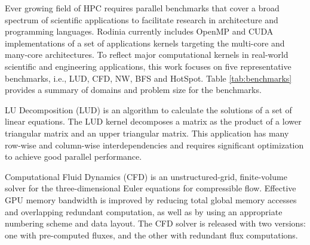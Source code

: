 
Ever growing field of HPC requires parallel benchmarks that cover a broad spectrum of scientific applications to 
facilitate research in architecture and programming languages. 
Rodinia currently includes OpenMP and CUDA implementations of a set of applications kernels targeting the multi-core and many-core 
architectures. To reflect major computational kernels in real-world scientific and engineering applications, this work focuses on five representative benchmarks, i.e., LUD, CFD, NW, BFS and HotSpot. Table \ref{tab:benchmarks} provides a summary of domains and problem size for the benchmarks. 


LU Decomposition (LUD) is an algorithm to calculate the solutions of a set of linear equations. The LUD kernel decomposes a matrix as the product of a lower triangular matrix and an upper triangular matrix. This application has many row-wise and column-wise interdependencies and requires significant optimization to achieve good parallel performance.



Computational Fluid Dynamics (CFD) is an unstructured-grid, finite-volume solver for the three-dimensional Euler equations for compressible flow. Effective GPU memory bandwidth is improved by reducing total global memory accesses and overlapping redundant computation, as well as by using an appropriate numbering scheme and data layout. The CFD solver is released with two versions: one with pre-computed fluxes, and the other with redundant flux computations.

